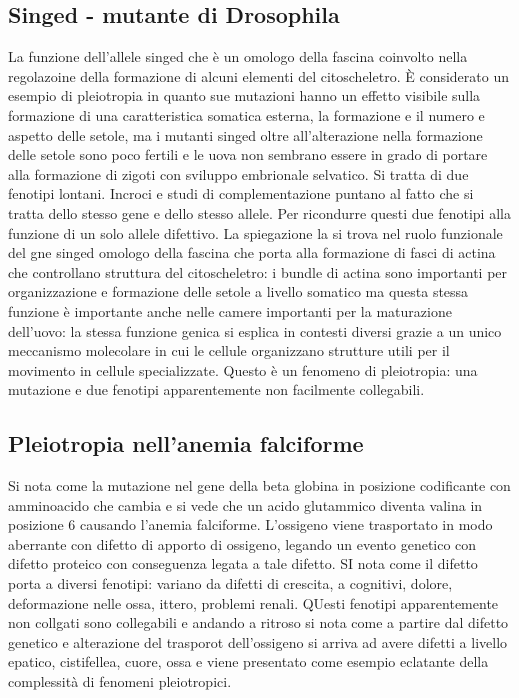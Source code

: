 \subsection{Singed - mutante di Drosophila}
La funzione dell'allele singed che \`e un omologo della fascina coinvolto nella regolazoine della formazione di alcuni elementi del citoscheletro. \`E considerato un esempio di 
pleiotropia in quanto sue mutazioni hanno un effetto visibile sulla formazione di una caratteristica somatica esterna, la formazione e il numero e aspetto delle setole, ma i mutanti 
singed oltre all'alterazione nella formazione delle setole sono poco fertili e le uova non sembrano essere in grado di portare alla formazione di zigoti con sviluppo embrionale 
selvatico. Si tratta di due fenotipi lontani. Incroci e studi di complementazione puntano al fatto che si tratta dello stesso gene e dello stesso allele. Per ricondurre questi due
fenotipi alla funzione di un solo allele difettivo. La spiegazione la si trova nel ruolo funzionale del gne singed omologo della fascina che porta alla formazione di fasci di actina
che controllano struttura del citoscheletro: i bundle di actina sono importanti per organizzazione e formazione delle setole a livello somatico ma questa stessa funzione \`e importante
anche nelle camere importanti per la maturazione dell'uovo: la stessa funzione genica si esplica in contesti diversi grazie a un unico meccanismo molecolare in cui le cellule 
organizzano strutture utili per il movimento in cellule specializzate. Questo \`e un fenomeno di pleiotropia: una mutazione e due fenotipi apparentemente non facilmente collegabili. 
\subsection{Pleiotropia nell'anemia falciforme}
Si nota come la mutazione nel gene della beta globina in posizione codificante con amminoacido che cambia e si vede che un acido glutammico diventa valina in posizione $6$ causando 
l'anemia falciforme. L'ossigeno viene trasportato in modo aberrante con difetto di apporto di ossigeno, legando un evento genetico con difetto proteico con conseguenza legata a tale
difetto. SI nota come il difetto porta a diversi fenotipi: variano da difetti di crescita, a cognitivi, dolore, deformazione nelle ossa, ittero, problemi renali. QUesti fenotipi 
apparentemente non collgati sono collegabili e andando a ritroso si nota come a partire dal difetto genetico e alterazione del trasporot dell'ossigeno si arriva ad avere difetti a 
livello epatico, cistifellea, cuore, ossa e viene presentato come esempio eclatante della complessit\`a di fenomeni pleiotropici. 

